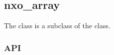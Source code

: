 %
%
%
%
%              

\subsection{nxo\_array}
\label{nxo_array}

The  class is a subclass of the  class.

\subsubsection{API}
